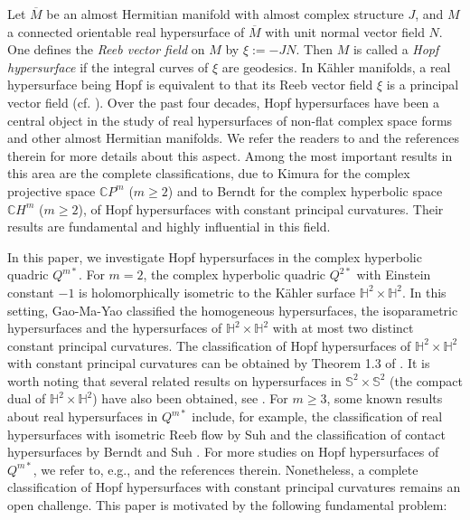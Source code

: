 \documentclass[reqno]{amsart}%
\theoremstyle{definition}
\numberwithin{equation}{section}
\begin{document}
Let $\overline{M}$ be an almost Hermitian manifold with almost complex structure $J$, and $M$ a connected orientable real hypersurface of $\overline{M}$ with unit normal vector field $N$. One defines the 
{\it Reeb vector field} on $M$ by $\xi := -JN$. Then $M$ is called a 
{\it Hopf hypersurface} if the integral curves of $\xi$ are geodesics. In K\"ahler manifolds, a real hypersurface being Hopf is equivalent to that
its Reeb vector field $\xi$ is a principal vector field (cf. \cite{BBW}). 
Over the past four decades, Hopf hypersurfaces have been a central object in the study of real hypersurfaces of non-flat complex space forms and other almost Hermitian manifolds. 
We refer the readers to \cite{B,BS-2022,CR,KM,NR} and the references therein for more details about this aspect. 
Among the most important results in this area are the complete classifications, due to Kimura \cite{KM} for the 
complex projective space $\mathbb{C}P^m$ ($m\geq2$) and to Berndt \cite{B} for the complex hyperbolic space $\mathbb{C}H^m$ ($m\geq2$), of Hopf hypersurfaces with constant principal curvatures. Their results are fundamental and highly influential in this field. 





In this paper, we investigate Hopf hypersurfaces in the complex hyperbolic quadric $Q^{m*}$.  For $m=2$, the complex hyperbolic quadric $Q^{2*}$
with Einstein constant $-1$ is holomorphically isometric to the K\"ahler surface
$\mathbb{H}^2\times\mathbb{H}^2$. In this setting, Gao-Ma-Yao \cite{GMY} classified the homogeneous hypersurfaces, the isoparametric hypersurfaces and the hypersurfaces of $\mathbb{H}^2\times\mathbb{H}^2$ with at most two distinct constant principal curvatures. The classification of
Hopf hypersurfaces of $\mathbb{H}^2\times\mathbb{H}^2$ with constant principal curvatures can be obtained by Theorem 1.3 of \cite{ZGHY}.  
It is worth noting that several related results on hypersurfaces in $\mathbb{S}^2\times\mathbb{S}^2$ (the compact dual of 
$\mathbb{H}^2\times\mathbb{H}^2$) have also been obtained, see \cite{GHMY, LVWY, Ur}. 
For $m\geq3$, some known results about real hypersurfaces in $Q^{m*}$ include, for example, the classification of real hypersurfaces with isometric Reeb flow by Suh \cite{Suh4} and the classification of contact hypersurfaces by Berndt and Suh \cite{BS-2022}. 
For more studies on Hopf hypersurfaces of $Q^{m*}$, we refer to, e.g.,
\cite{B-2023,BS-2022,K-S,Suh4} and the references therein. 
Nonetheless, a complete classification of Hopf hypersurfaces with constant principal curvatures remains an open challenge. This paper is motivated by the following fundamental problem:
\end{document}
